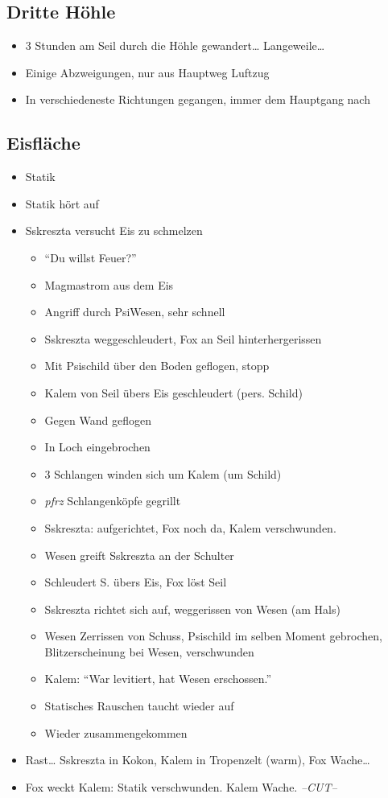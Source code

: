 \documentclass[11pt]{scrartcl}
\begin{document}
\subsection{Dritte Höhle}

\begin{itemize}
\item
  3 Stunden am Seil durch die Höhle gewandert\ldots{} Langeweile\ldots{}
\item
  Einige Abzweigungen, nur aus Hauptweg Luftzug
\item
  In verschiedeneste Richtungen gegangen, immer dem Hauptgang nach
\end{itemize}
\subsection{Eisfläche}

\begin{itemize}
\item
  Statik
\item
  Statik hört auf
\item
  Sskreszta versucht Eis zu schmelzen

  \begin{itemize}
  \item
    ``Du willst Feuer?''
  \item
    Magmastrom aus dem Eis
  \item
    Angriff durch PsiWesen, sehr schnell
  \item
    Sskreszta weggeschleudert, Fox an Seil hinterhergerissen
  \item
    Mit Psischild über den Boden geflogen, stopp
  \item
    Kalem von Seil übers Eis geschleudert (pers. Schild)
  \item
    Gegen Wand geflogen
  \item
    In Loch eingebrochen
  \item
    3 Schlangen winden sich um Kalem (um Schild)
  \item
    \emph{pfrz} Schlangenköpfe gegrillt
  \item
    Sskreszta: aufgerichtet, Fox noch da, Kalem verschwunden.
  \item
    Wesen greift Sskreszta an der Schulter
  \item
    Schleudert S. übers Eis, Fox löst Seil
  \item
    Sskreszta richtet sich auf, weggerissen von Wesen (am Hals)
  \item
    Wesen Zerrissen von Schuss, Psischild im selben Moment gebrochen,
    Blitzerscheinung bei Wesen, verschwunden
  \item
    Kalem: ``War levitiert, hat Wesen erschossen.''
  \item
    Statisches Rauschen taucht wieder auf
  \item
    Wieder zusammengekommen
  \end{itemize}
\item
  Rast\ldots{} Sskreszta in Kokon, Kalem in Tropenzelt (warm), Fox
  Wache\ldots{}
\item
  Fox weckt Kalem: Statik verschwunden. Kalem Wache. \emph{--CUT--}
\end{itemize}
\end{document}
